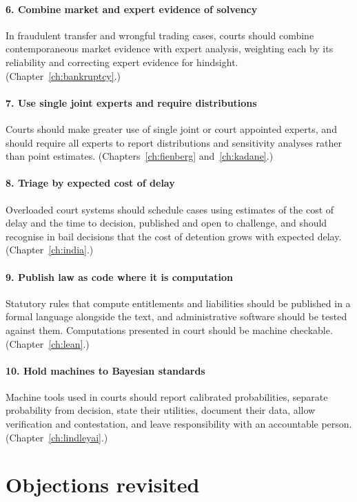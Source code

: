 \paragraph{6. Combine market and expert evidence of solvency} In fraudulent transfer and wrongful trading cases, courts should combine contemporaneous market evidence with expert analysis, weighting each by its reliability and correcting expert evidence for hindsight. (Chapter~\ref{ch:bankruptcy}.)

\paragraph{7. Use single joint experts and require distributions} Courts should make greater use of single joint or court appointed experts, and should require all experts to report distributions and sensitivity analyses rather than point estimates. (Chapters~\ref{ch:fienberg} and~\ref{ch:kadane}.)

\paragraph{8. Triage by expected cost of delay} Overloaded court systems should schedule cases using estimates of the cost of delay and the time to decision, published and open to challenge, and should recognise in bail decisions that the cost of detention grows with expected delay. (Chapter~\ref{ch:india}.)

\paragraph{9. Publish law as code where it is computation} Statutory rules that compute entitlements and liabilities should be published in a formal language alongside the text, and administrative software should be tested against them. Computations presented in court should be machine checkable. (Chapter~\ref{ch:lean}.)

\paragraph{10. Hold machines to Bayesian standards} Machine tools used in courts should report calibrated probabilities, separate probability from decision, state their utilities, document their data, allow verification and contestation, and leave responsibility with an accountable person. (Chapter~\ref{ch:lindleyai}.)

\section{Objections revisited}

